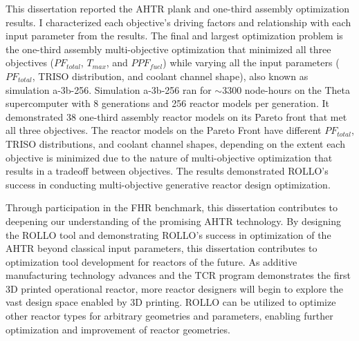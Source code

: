 This dissertation reported the \gls{AHTR} plank and one-third assembly optimization 
results. 
I characterized each objective's driving factors and relationship with each input 
parameter from the results. 
The final and largest optimization problem is the one-third assembly multi-objective 
optimization that minimized all three objectives ($PF_{total}$, $T_{max}$, and 
$PPF_{fuel}$) while varying all the input parameters ($PF_{total}$, TRISO distribution, 
and coolant channel shape), also known as simulation a-3b-256. 
Simulation a-3b-256 ran for $\sim 3300$ node-hours on the Theta supercomputer with 
8 generations and 256 reactor models per generation. 
It demonstrated 38 one-third assembly reactor models on its Pareto front that met all 
three objectives. 
The reactor models on the Pareto Front have different $PF_{total}$, TRISO distributions, 
and coolant channel shapes, depending on the extent each objective is minimized due 
to the nature of multi-objective optimization that results in a tradeoff between 
objectives. 
The results demonstrated \gls{ROLLO}'s success in conducting multi-objective generative 
reactor design optimization. 

Through participation in the \gls{FHR} benchmark, this dissertation contributes to 
deepening our understanding of the promising \gls{AHTR} technology. 
By designing the \gls{ROLLO} tool and demonstrating \gls{ROLLO}'s success in 
optimization of the \gls{AHTR} beyond classical input parameters, this dissertation 
contributes to optimization tool development for reactors of the future. 
As additive manufacturing technology advances and the \gls{TCR} program 
demonstrates the first 3D printed operational reactor, more reactor designers 
will begin to explore the vast design space enabled by 3D printing. 
\gls{ROLLO} can be utilized to optimize other reactor types for arbitrary
geometries and parameters, enabling further optimization and improvement of reactor 
geometries.